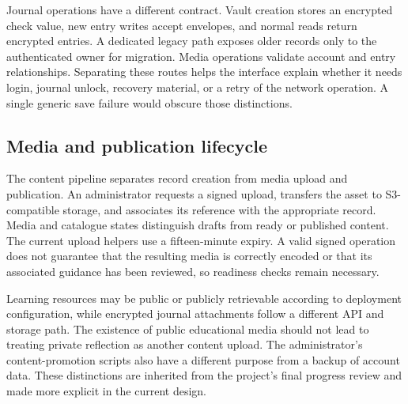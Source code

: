Journal operations have a different contract. Vault creation stores an encrypted check value, new entry writes accept envelopes, and normal reads return encrypted entries. A dedicated legacy path exposes older records only to the authenticated owner for migration. Media operations validate account and entry relationships. Separating these routes helps the interface explain whether it needs login, journal unlock, recovery material, or a retry of the network operation. A single generic save failure would obscure those distinctions.

\subsection{Media and publication lifecycle}

The content pipeline separates record creation from media upload and publication. An administrator requests a signed upload, transfers the asset to S3-compatible storage, and associates its reference with the appropriate record. Media and catalogue states distinguish drafts from ready or published content. The current upload helpers use a fifteen-minute expiry. A valid signed operation does not guarantee that the resulting media is correctly encoded or that its associated guidance has been reviewed, so readiness checks remain necessary.

Learning resources may be public or publicly retrievable according to deployment configuration, while encrypted journal attachments follow a different API and storage path. The existence of public educational media should not lead to treating private reflection as another content upload. The administrator's content-promotion scripts also have a different purpose from a backup of account data. These distinctions are inherited from the project's final progress review and made more explicit in the current design.
